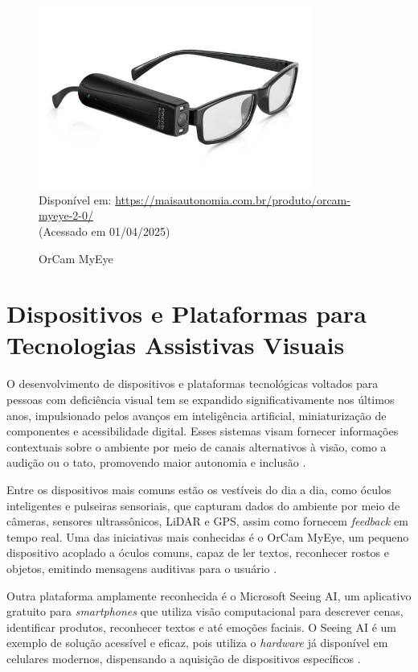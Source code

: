 \begin{figure}[htbp]
  \centering
  \caption{OrCam MyEye}
  \includegraphics[width=0.8\textwidth]{Figuras/orcammyeye.jpg}
  \\
  Disponível em: \url{https://maisautonomia.com.br/produto/orcam-myeye-2-0/} \\(Acessado em 01/04/2025)
  \label{fg-orcammyeye}
\end{figure}

\section{\textbf{Dispositivos e Plataformas para Tecnologias Assistivas Visuais}}

O desenvolvimento de dispositivos e plataformas tecnológicas voltados para pessoas com deficiência visual tem se expandido significativamente nos últimos anos, impulsionado pelos avanços em inteligência artificial, miniaturização de componentes e acessibilidade digital. Esses sistemas visam fornecer informações contextuais sobre o ambiente por meio de canais alternativos à visão, como a audição ou o tato, promovendo maior autonomia e inclusão \cite{Saeedi2021}.

Entre os dispositivos mais comuns estão os vestíveis do dia a dia, como óculos inteligentes e pulseiras sensoriais, que capturam dados do ambiente por meio de câmeras, sensores ultrassônicos, LiDAR e GPS, assim como fornecem \textit{feedback} em tempo real. Uma das iniciativas mais conhecidas é o OrCam MyEye, um pequeno dispositivo acoplado a óculos comuns, capaz de ler textos, reconhecer rostos e objetos, emitindo mensagens auditivas para o usuário \cite{OrCam2022}.

Outra plataforma amplamente reconhecida é o Microsoft Seeing AI, um aplicativo gratuito para \textit{smartphones} que utiliza visão computacional para descrever cenas, identificar produtos, reconhecer textos e até emoções faciais. O Seeing AI é um exemplo de solução acessível e eficaz, pois utiliza o \textit{hardware} já disponível em celulares modernos, dispensando a aquisição de dispositivos específicos \cite{Microsoft2023}.

